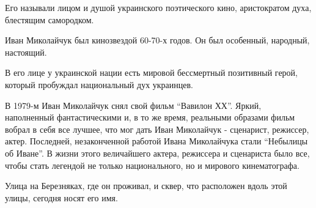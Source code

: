 \begin{multicols}{2}
Его называли лицом и душой украинского поэтического кино, аристократом духа,
блестящим самородком.

Иван Миколайчук был кинозвездой 60-70-х годов. Он был особенный, народный,
настоящий.

В его лице у украинской нации есть мировой бессмертный позитивный герой,
который пробуждал национальный дух украинцев.

В 1979-м Иван Миколайчук снял свой фильм \enquote{Вавилон ХХ}. Яркий, наполненный
фантастическими и, в то же время, реальными образами фильм вобрал в себя все
лучшее, что мог дать Иван Миколайчук - сценарист, режиссер, актер. Последней,
незаконченной работой Ивана Миколайчука стали \enquote{Небылицы об Иване}. В жизни
этого величайшего актера, режиссера и сценариста было все, чтобы стать легендой
не только национального, но и мирового кинематографа.

Улица на Березняках, где он проживал, и сквер, что расположен вдоль этой
улицы, сегодня носят его имя.

\end{multicols} %
